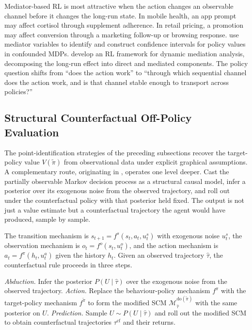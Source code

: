 Mediator-based RL is most attractive when the action changes an observable channel before it changes the long-run state. In mobile health, an app prompt may affect cortisol through supplement adherence. In retail pricing, a promotion may affect conversion through a marketing follow-up or browsing response. \citet{shiZhuShenLuoZhuSong2024cmdpCI} use mediator variables to identify and construct confidence intervals for policy values in confounded MDPs. \citet{geEtAl2023dynamicMediation} develop an RL framework for dynamic mediation analysis, decomposing the long-run effect into direct and mediated components. The policy question shifts from ``does the action work'' to ``through which sequential channel does the action work, and is that channel stable enough to transport across policies?''

\subsection{Structural Counterfactual Off-Policy Evaluation}
\label{subsec:cfope_scm}

The point-identification strategies of the preceding subsections recover the target-policy value $V(\widetilde\pi)$ from observational data under explicit graphical assumptions. A complementary route, originating in \citet{buesing2019woulda}, operates one level deeper. Cast the partially observable Markov decision process as a structural causal model, infer a posterior over its exogenous noise from the observed trajectory, and roll out under the counterfactual policy with that posterior held fixed. The output is not just a value estimate but a counterfactual trajectory the agent would have produced, sample by sample.

The transition mechanism is $s_{t+1} = f^s(s_t, a_t, u^s_t)$ with exogenous noise $u^s_t$, the observation mechanism is $o_t = f^o(s_t, u^o_t)$, and the action mechanism is $a_t = f^\pi(h_t, u^a_t)$ given the history $h_t$. Given an observed trajectory $\hat\tau$, the counterfactual rule proceeds in three steps.

\begin{algorithm}[h]
\caption{Counterfactual off-policy evaluation \citep{buesing2019woulda}}
\label{alg:buesing_cfope}
\begin{algorithmic}[1]
\State \emph{Abduction.} Infer the posterior $P(U \mid \hat\tau)$ over the exogenous noise from the observed trajectory.
\State \emph{Action.} Replace the behaviour-policy mechanism $f^\pi$ with the target-policy mechanism $f^{\widetilde\pi}$ to form the modified SCM $\mathcal M^{\mathrm{do}(\widetilde\pi)}_{\hat\tau}$ with the same posterior on $U$.
\State \emph{Prediction.} Sample $U \sim P(U \mid \hat\tau)$ and roll out the modified SCM to obtain counterfactual trajectories $\tau^{\mathrm{cf}}$ and their returns.
\end{algorithmic}
\end{algorithm}

